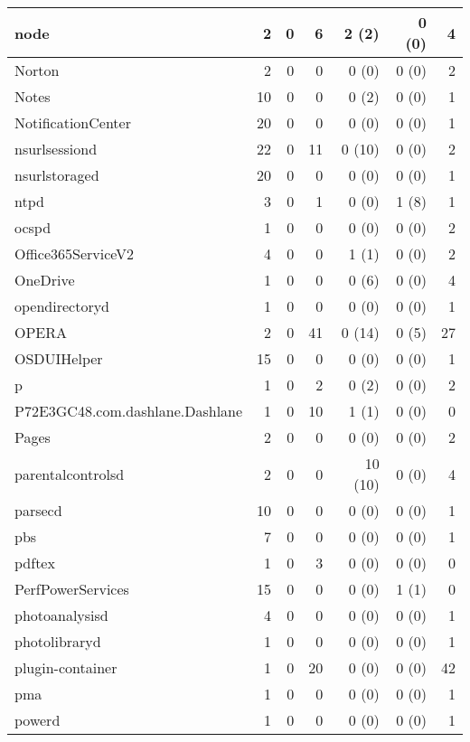 \begin{adjustwidth}{-2in}{}
\begin{scriptsize}
\begin{longtable}[l]{ l | r | r | r | r | r | r }
    node & 2 &  0 &  6 &  2 (2) &  0 (0) &  4 \\ \hline
    Norton & 2 &  0 &  0 &  0 (0) &  0 (0) &  2 \\ \hline
    Notes & 10 &  0 &  0 &  0 (2) &  0 (0) &  1 \\ \hline
    NotificationCenter &  20 &  0 &  0 &  0 (0) &  0 (0) &  1 \\ \hline
    nsurlsessiond & 22 &  0 & 11 & 0 (10) &  0 (0) &  2 \\ \hline
    nsurlstoraged & 20 &  0 &  0 &  0 (0) &  0 (0) &  1 \\ \hline
    ntpd & 3 &  0 &  1 &  0 (0) &  1 (8) &  1 \\ \hline
    ocspd &  1 &  0 &  0 &  0 (0) &  0 (0) &  2 \\ \hline
    Office365ServiceV2 & 4 &  0 &  0 &  1 (1) &  0 (0) &  2 \\ \hline
    OneDrive & 1 &  0 &  0 &  0 (6) &  0 (0) &  4 \\ \hline
    opendirectoryd & 1 &  0 &  0 &  0 (0) &  0 (0) &  1 \\ \hline
    OPERA &  2 &  0 & 41 & 0 (14) &  0 (5) & 27 \\ \hline
    OSDUIHelper & 15 &  0 &  0 &  0 (0) &  0 (0) &  1 \\ \hline
    p &  1 &  0 &  2 &  0 (2) &  0 (0) &  2 \\ \hline
    P72E3GC48.com.dashlane.Dashlane &  1 &  0 & 10 &  1 (1) &  0 (0) &  0 \\ \hline
    Pages &  2 &  0 &  0 &  0 (0) &  0 (0) &  2 \\ \hline
    parentalcontrolsd &  2 &  0 &  0 &  10 (10) &  0 (0) &  4 \\ \hline
    parsecd & 10 &  0 &  0 &  0 (0) &  0 (0) &  1 \\ \hline
    pbs &  7 &  0 &  0 &  0 (0) &  0 (0) &  1 \\ \hline
    pdftex & 1 &  0 &  3 &  0 (0) &  0 (0) &  0 \\ \hline
    PerfPowerServices & 15 &  0 &  0 &  0 (0) &  1 (1) &  0 \\ \hline
    photoanalysisd & 4 &  0 &  0 &  0 (0) &  0 (0) &  1 \\ \hline
    photolibraryd &  1 &  0 &  0 &  0 (0) &  0 (0) &  1 \\ \hline
    plugin-container & 1 &  0 & 20 &  0 (0) &  0 (0) & 42 \\ \hline
    pma &  1 &  0 &  0 &  0 (0) &  0 (0) &  1 \\ \hline
    powerd & 1 &  0 &  0 &  0 (0) &  0 (0) &  1 \\ \hline

\end{longtable}
\end{scriptsize}
\end{adjustwidth}
